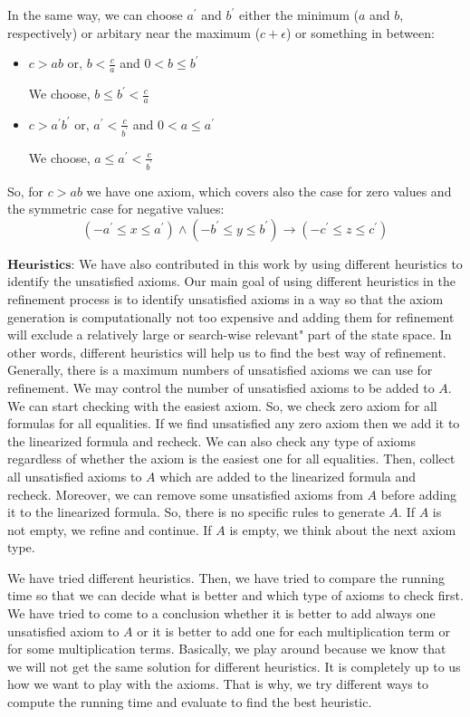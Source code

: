 \noindent In the same way, we can choose $a^\prime$ and $b^\prime$ either the minimum ($a$ and $b$, respectively) or arbitary near the maximum ($c + \epsilon$) or something in between:
\begin{itemize}
    \item $c > ab \text{ or, } b < \frac{c}{a}$ and $0 < b \leq b^\prime$\newline
    
    We choose, $b \leq b^\prime < \frac{c}{a}$
     \item $c > a^\prime b^\prime \text{ or, } a^\prime < \frac{c}{b^\prime}$ and $0 < a \leq a^\prime$\newline
     
     We choose, $a \leq a^\prime < \frac{c}{b^\prime}$
\end{itemize}

\noindent  So, for $c > ab$ we have one axiom, which covers also the case for zero values and the symmetric case for negative values:
$$(-a^\prime \leq x \leq a^\prime) \wedge (-b^\prime \leq y \leq b^\prime) \to (-c^\prime \leq z \leq c^\prime)$$

\noindent  $\textbf{Heuristics:}$ We have also contributed in this work by using different heuristics to identify the unsatisfied axioms.
Our main goal of using different heuristics in the refinement process is to identify unsatisfied axioms in a way so that the axiom generation is computationally not too expensive and adding them for refinement will exclude a relatively large or search-wise relevant" part of the state space.
In other words, different heuristics will help us to find the best way of refinement.
Generally, there is a maximum numbers of unsatisfied axioms we can use for refinement.
We may control the number of unsatisfied axioms to be added to $A$.
We can start checking with the easiest axiom. 
So, we check zero axiom for all formulas for all equalities.
If we find unsatisfied any zero axiom then we add it to the linearized formula and recheck.
We can also check any type of axioms regardless of whether the axiom is the easiest one for all equalities.
Then, collect all unsatisfied axioms to $A$ which are added to the linearized formula  and recheck.
Moreover, we can remove some unsatisfied axioms from $A$ before adding it to the linearized formula.
So, there is no specific rules to generate $A$.
If $A$ is not empty, we refine and continue. 
If $A$ is empty, we think about the next axiom type.\newline

\noindent We have tried different heuristics.
Then, we have tried to compare the running time so that we can decide what is better and which type of axioms to check first.
We have tried to come to a conclusion whether it is better to add always one unsatisfied axiom to $A$ or it is better to add one for each multiplication term or for some multiplication terms.
Basically, we play around because we know that we will not get the same solution for different heuristics.
It is completely up to us how we want to play with the axioms.
That is why, we try different ways to compute the running time and evaluate to find the best heuristic.\newline


